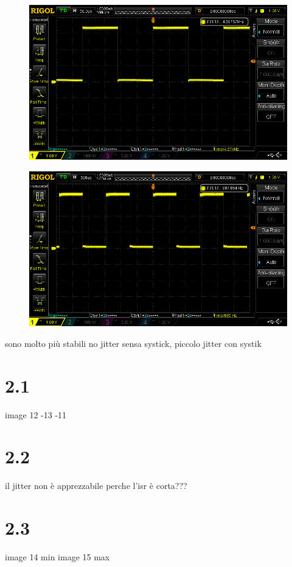 \documentclass[12pt]{article}
\begin{document}
\begin{figure}[h!]
	\centering
	\includegraphics[scale = 0.4]{immagini/DS1Z_QuickPrint10.png}
	\caption{}
\end{figure}
\begin{figure}[h!]
	\centering
	\includegraphics[scale = 0.4]{immagini/DS1Z_QuickPrint11.png}
	\caption{}
\end{figure}


sono molto più stabili
no jitter sensa systick, piccolo jitter con systik


\section*{2.1}

image 12 -13 -11

\section*{2.2 }
il jitter non è apprezzabile perche l'isr è corta???

\section*{2.3 }
image 14 min
image 15 max
\end{document}
